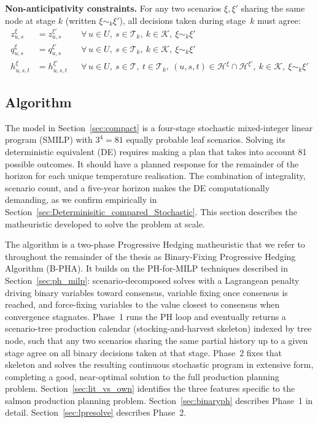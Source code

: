 \documentclass[12pt,a4paper]{article}
\begin{document}
\noindent \textbf{Non-anticipativity constraints.}
For any two scenarios $\xi, \xi'$ sharing the same node at stage $k$ (written $\xi \sim_k \xi'$), all decisions taken during stage~$k$ must agree:
\begin{align}
  z^\xi_{u,s}   &= z^{\xi'}_{u,s}
    && \forall\, u \in U,\ s \in \mathcal{T}_k,\ k \in \mathcal{K},\ \xi\sim_k\xi'
    \label{eq:NA1}\\
  q^\xi_{u,s}   &= q^{\xi'}_{u,s}
    && \forall\, u \in U,\ s \in \mathcal{T}_k,\ k \in \mathcal{K},\ \xi\sim_k\xi'
    \label{eq:NA2}\\
  h^\xi_{u,s,t} &= h^{\xi'}_{u,s,t}
    && \forall\, u \in U,\ s \in \mathcal{T},\ t \in \mathcal{T}_k,\
       (u,s,t) \in \mathcal{H}^\xi \cap \mathcal{H}^{\xi'},\
       k \in \mathcal{K},\ \xi\sim_k\xi'
    \label{eq:NA3}
\end{align}
 
 


\subsection{Algorithm}
\label{sec:algorithm}
The model in Section~\ref{sec:compact} is a four-stage stochastic mixed-integer linear
program (SMILP) with $3^4 = 81$ equally probable leaf scenarios. Solving its deterministic equivalent (DE) requires making a plan that takes into account 81 possible outcomes. It should have a planned response for the remainder of the horizon for each unique temperature realisation. The combination of integrality, scenario count, and a five-year horizon makes the DE computationally demanding, as we confirm empirically in Section~\ref{sec:Determinisitic_compared_Stochastic}. This section describes the matheuristic developed to solve the problem at scale.


The algorithm is a two-phase Progressive Hedging matheuristic that we refer to
throughout the remainder of the thesis as Binary-Fixing Progressive Hedging Algorithm
(B-PHA). It builds on the PH-for-MILP techniques described in
Section~\ref{sec:ph_milp}: scenario-decomposed solves with a Lagrangean penalty
driving binary variables toward consensus, variable fixing once consensus is reached,
and force-fixing variables to the value closest to consensus when convergence stagnates. Phase~1 runs the PH
loop and eventually returns a scenario-tree production calendar (stocking-and-harvest skeleton) indexed by tree node, such that any two scenarios sharing the same partial history up to
a given stage agree on all binary decisions taken at that stage. Phase~2 fixes that skeleton and
solves the resulting continuous stochastic program in extensive form, completing a good,
near-optimal solution to the full production planning problem.
Section~\ref{sec:lit_vs_own} identifies the three features specific to the salmon
production planning problem. Section~\ref{sec:binaryph} describes Phase~1 in detail.
Section~\ref{sec:lpresolve} describes Phase~2.
\end{document}
